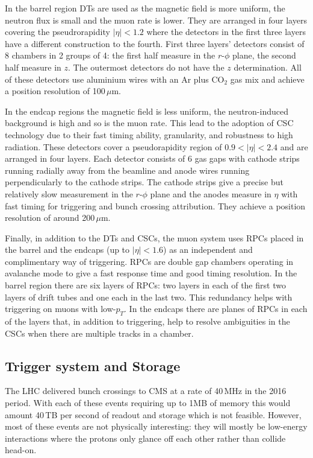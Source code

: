 In the barrel region DTs are used as the magnetic field is more uniform, the neutron flux is small and the muon rate is lower. They are arranged in four layers covering the pseudrorapidity $|\eta|<1.2$ where the detectors in the first three layers have a different construction to the fourth. First three layers' detectors consist of 8 chambers in 2 groups of 4: the first half measure in the $r$-$\phi$ plane, the second half measure in $z$. The outermost detectors do not have the $z$ determination. All of these detectors use aluminium wires with an Ar plus CO$_{2}$ gas mix and achieve a position resolution of 100\,$\mu$m.


In the endcap regions the magnetic field is less uniform, the neutron-induced background is high and so is the muon rate. This lead to the adoption of CSC technology due to their fast timing ability, granularity, and robustness to high radiation. 
These detectors cover a pseudorapidity region of $0.9<|\eta|<2.4$ and are arranged in four layers. Each detector consists of 6 gas gaps with cathode strips running radially away from the beamline and anode wires running perpendicularly to the cathode strips. The cathode strips give a precise but relatively slow measurement in the $r$-$\phi$ plane and the anodes measure in $\eta$ with fast timing for triggering and bunch crossing attribution. They achieve a position resolution of around 200\,$\mu$m. 


Finally, in addition to the DTs and CSCs, the muon system uses RPCs placed in the barrel and the endcaps (up to $|\eta|<1.6$) as an independent and complimentary way of triggering. 
RPCs are double gap chambers operating in avalanche mode to give a fast response time and good timing resolution. In the barrel region there are six layers of RPCs: two layers in each of the first two layers of drift tubes and one each in the last two. This redundancy helps with triggering on muons with low-$p_{T}$. In the endcaps there are planes of RPCs in each of the layers that, in addition to triggering, help to resolve ambiguities in the CSCs when there are multiple tracks in a chamber. 


\subsection{Trigger system and Storage}
The LHC delivered bunch crossings to CMS at a rate of 40\,MHz in the 2016 period. With each of these events requiring up to 1MB of memory this would amount 40\,TB per second of readout and storage which is not feasible. 
However, most of these events are not physically interesting: they will mostly be low-energy interactions where the protons only glance off each other rather than collide head-on. 

